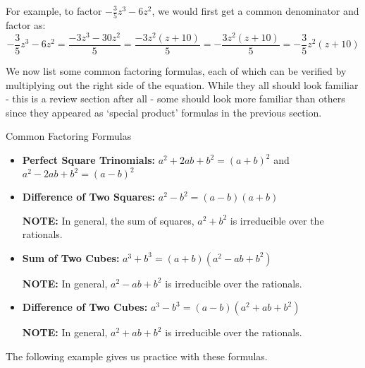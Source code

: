 For example, to factor $-\frac{3}{5}z^3 - 6z^2$, we would first get a common denominator and factor as: \[ -\frac{3}{5}z^3 - 6z^2 = \frac{-3z^3 - 30z^2}{5} = \frac{-3z^2(z + 10)}{5} = -\frac{3z^2(z + 10)}{5} = -\frac{3}{5}z^{2}(z + 10)\]

We now list some common factoring formulas, each of which can be verified by multiplying out the right side of the equation.  While they all should look familiar - this is a review section after all - some should look more familiar than others since they appeared as `special product' formulas in the previous section.  

\begin{floatbox}[label=box:CommonFactoringFormulas]{Common Factoring Formulas}

\begin{itemize}[leftmargin=*]

\item \textbf{Perfect Square Trinomials:}  $a^2 + 2ab + b^2 = (a+b)^2$ and $a^2 - 2ab + b^2 = (a-b)^2$
\item  \textbf{Difference of Two Squares:}  $a^2 - b^2 = (a-b)(a+b)$

\textbf{NOTE:}  In general, the sum of squares, $a^2 + b^2$ is irreducible over the rationals.

\item  \textbf{Sum of Two Cubes:}  $a^3 + b^3 = (a + b)(a^2 - ab + b^2)$

\textbf{NOTE:}  In general, $a^2 - ab + b^2$ is irreducible over the rationals.

\item   \textbf{Difference of Two Cubes:}  $a^3 - b^3 = (a - b)(a^2 + ab + b^2)$ 

\textbf{NOTE:}  In general, $a^2 + ab + b^2$ is irreducible over the rationals.
\end{itemize}

\end{floatbox}

The following example gives us practice with these formulas.

